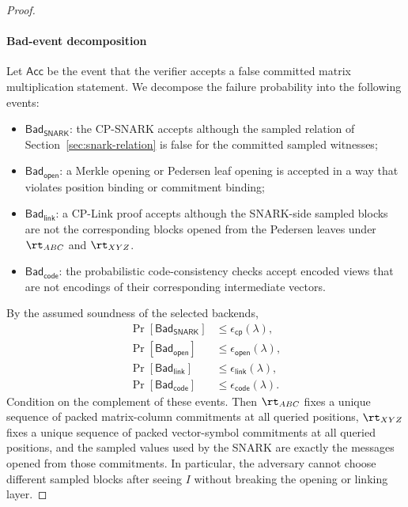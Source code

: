 \begin{proof}
\paragraph{Bad-event decomposition}
Let \(\mathsf{Acc}\) be the event that the verifier accepts a false committed
matrix multiplication statement.  We decompose the failure probability into
the following events:
\begin{itemize}
  \item \(\mathsf{Bad}_{\mathsf{SNARK}}\): the CP-SNARK accepts although the
  sampled relation of Section~\ref{sec:snark-relation} is false for the
  committed sampled witnesses;
  \item \(\mathsf{Bad}_{\mathsf{open}}\): a Merkle opening or Pedersen leaf
  opening is accepted in a way that violates position binding or commitment
  binding;
	  \item \(\mathsf{Bad}_{\mathsf{link}}\): a CP-Link proof accepts although the
	  SNARK-side sampled blocks are not the corresponding blocks opened from the
	  Pedersen leaves under \(\rt_{ABC}\) and \(\rt_{XYZ}\).
  \item \(\mathsf{Bad}_{\mathsf{code}}\): the probabilistic code-consistency
  checks accept encoded views that are not encodings of their corresponding
  intermediate vectors.
\end{itemize}
By the assumed soundness of the selected backends,
\[
\begin{aligned}
\Pr[\mathsf{Bad}_{\mathsf{SNARK}}]
  &\le \epsilon_{\mathsf{cp}}(\lambda),\\
\Pr[\mathsf{Bad}_{\mathsf{open}}]
  &\le \epsilon_{\mathsf{open}}(\lambda),\\
\Pr[\mathsf{Bad}_{\mathsf{link}}]
  &\le \epsilon_{\mathsf{link}}(\lambda),\\
\Pr[\mathsf{Bad}_{\mathsf{code}}]
  &\le \epsilon_{\mathsf{code}}(\lambda).
\end{aligned}
\]
Condition on the complement of these events.  Then \(\rt_{ABC}\) fixes a
unique sequence of packed matrix-column commitments at all queried positions,
\(\rt_{XYZ}\) fixes a unique sequence of packed vector-symbol commitments at
all queried positions, and the sampled values used by the SNARK are exactly the
messages opened from those commitments.  In particular, the adversary cannot
choose different sampled blocks after seeing \(I\) without breaking the
opening or linking layer.


\end{proof}
